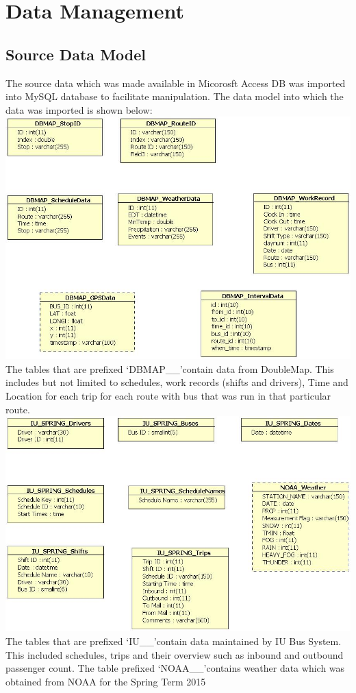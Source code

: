 \documentclass[12pt]{article}\usepackage[]{graphicx}\usepackage[]{color}
\begin{document}
\section{Data Management}
\subsection{Source Data Model}
The source data which was made available in Micorosft Access DB was imported into MySQL database to facilitate manipulation. The data model into which the data was imported is shown below:\\
\includegraphics[scale=0.5]{resources/dbmap_access}\\[1cm] 

The tables that are prefixed \lq DBMAP\_\_\rq contain data from DoubleMap. This includes but not limited to schedules, work records (shifts and drivers), Time and Location for each trip for each route with bus that was run in that particular route. \\
\includegraphics[scale=0.5]{resources/IU_access}\\[1cm] 
The tables that are prefixed \lq IU\_\_\rq contain data maintained by IU Bus System. This included schedules, trips and their overview such as inbound and outbound passenger count. The table prefixed \lq NOAA\_\_\rq contains weather data which was obtained from NOAA\cite{6} for the 
Spring Term 2015\\
\end{document}
